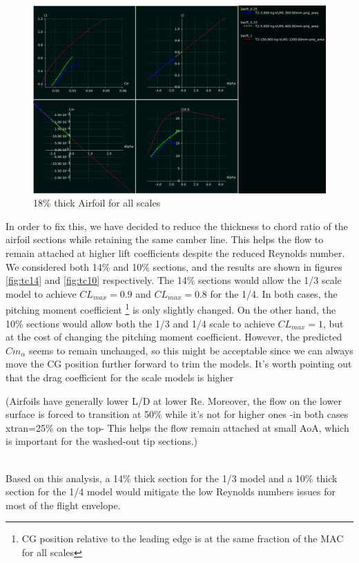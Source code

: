 \documentclass[titlepage,10pt]{article}
\begin{document}
\begin{figure}[h]
\begin{center}
\includegraphics[width=120mm]{scale_original_airfoil.png}
\end{center}
\caption{18\% thick Airfoil for all scales}
\label{fig:tc18}
\end{figure}

\enlargethispage{6\baselineskip}
In order to fix this, we have decided to reduce the thickness to chord ratio of the airfoil sections while retaining the same camber line. This helps the flow to remain attached at higher lift coefficients despite the reduced Reynolds number. We considered both 14\% and 10\% sections, and the results are shown in figures \ref{fig:tc14} and \ref{fig:tc10} respectively. The 14\% sections would allow the 1/3 scale model to achieve $CL_{max}=0.9$ and $CL_{max}=0.8$ for the 1/4. In both cases, the pitching moment coefficient \footnote{CG position relative to the leading edge is at the same fraction of the MAC for all scales} is only slightly changed. On the other hand, the 10\% sections would allow both the 1/3 and 1/4 scale to achieve $CL_{max}=1$, but at the cost of changing the pitching moment coefficient. However, the predicted $Cm_{\alpha}$ seems to remain unchanged, so this might be acceptable since we can always move the CG position further forward to trim the models. It's worth pointing out that the drag coefficient for the scale models is higher \begin{footnotesize}(Airfoils have generally lower L/D at lower Re. Moreover, the flow on the lower surface is forced to transition at 50\% while it's not for higher ones -in both cases xtran=25\% on the top- This helps the flow remain attached at small AoA, which is important for the washed-out tip sections.)\end{footnotesize}\\
Based on this analysis, a 14\% thick section for the 1/3 model and a 10\% thick section for the 1/4 model would mitigate the low Reynolds numbers issues for most of the flight envelope.
\end{document}
